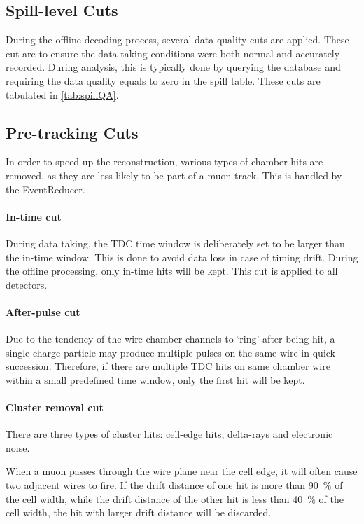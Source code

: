 \documentclass[../main.tex]{subfiles}
\begin{document}
\subsection{Spill-level Cuts}
During the offline decoding process, several data quality cuts are applied.
These cut are to ensure the data taking conditions were both normal and accurately recorded.
During analysis, this is typically done by querying the database
and requiring the data quality equals to zero in the spill table.
These cuts are tabulated in \cref{tab:spillQA}.



\subsection{Pre-tracking Cuts}
In order to speed up the reconstruction, various types of chamber hits are removed, as
they are less likely to be part of a muon track. This is handled by the EventReducer.

\paragraph{In-time cut}
During data taking, the TDC time window is deliberately set to be larger than the in-time
window. This is done to avoid data loss in case of timing drift\cite{daniel-4924}.
During the offline processing, only in-time hits will be kept. This cut is applied to
all detectors.

\paragraph{After-pulse cut}
Due to the tendency of the wire chamber channels to `ring' after being hit,
a single charge particle may produce multiple pulses on the same
wire in quick succession. Therefore, if there are multiple TDC hits on same chamber wire
within a small predefined time window, only the first hit will be kept.

\paragraph{Cluster removal cut}
There are three types of cluster hits: cell-edge hits, delta-rays and electronic noise.

When a muon passes through the wire plane near the cell edge, it will often cause two adjacent
wires to fire. If the drift distance of one hit is more than \SI{90}{\percent} of the cell width,
while the drift distance of the other hit is less than \SI{40}{\percent} of the cell width, the hit
with larger drift distance will be discarded.
\end{document}
